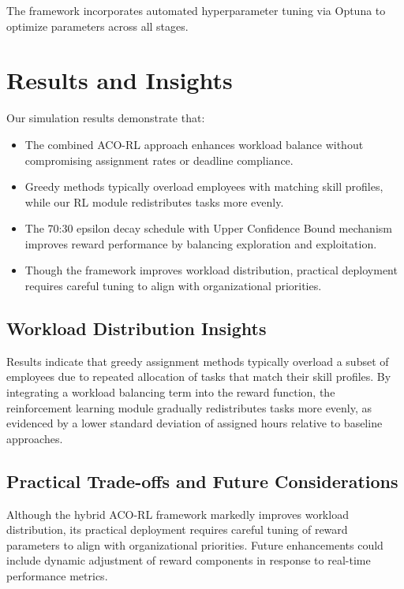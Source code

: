 \documentclass[12pt]{article}
\begin{document}
	The framework incorporates automated hyperparameter tuning via Optuna to optimize parameters across all stages.
	
	\section{\label{sec:inference}Results and Insights}
	
	Our simulation results demonstrate that:
	
	\begin{itemize}
		\item The combined ACO-RL approach enhances workload balance without compromising assignment rates or deadline compliance.
		
		\item Greedy methods typically overload employees with matching skill profiles, while our RL module redistributes tasks more evenly.
		
		\item The 70:30 epsilon decay schedule with Upper Confidence Bound mechanism improves reward performance by balancing exploration and exploitation.
		
		\item Though the framework improves workload distribution, practical deployment requires careful tuning to align with organizational priorities.
	\end{itemize}
	
	\subsection{\label{subsec:workload}Workload Distribution Insights}
	
	Results indicate that greedy assignment methods typically overload a subset of employees due to repeated allocation of tasks that match their skill profiles. By integrating a workload balancing term into the reward function, the reinforcement learning module gradually redistributes tasks more evenly, as evidenced by a lower standard deviation of assigned hours relative to baseline approaches.
	
	\subsection{\label{subsec:tradeoffs}Practical Trade-offs and Future Considerations}
	
	Although the hybrid ACO-RL framework markedly improves workload distribution, its practical deployment requires careful tuning of reward parameters to align with organizational priorities. Future enhancements could include dynamic adjustment of reward components in response to real-time performance metrics.
	
\end{document}

